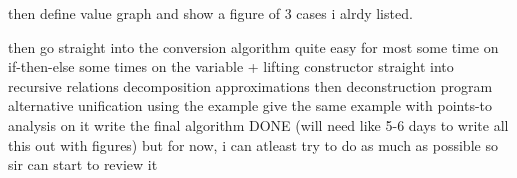 then define value graph and show a figure of 3 cases i alrdy listed.

then go straight into the conversion algorithm
quite easy for most
some time on if-then-else
some times on the variable + lifting constructor
straight into recursive relations
decomposition
approximations
then deconstruction program alternative
unification using the example
give the same example with points-to analysis on it
write the final algorithm
DONE
(will need like 5-6 days to write all this out with figures)
but for now, i can atleast try to do as much as possible so sir can start to review it